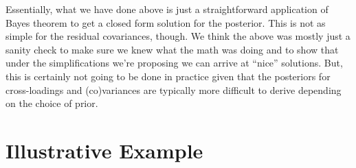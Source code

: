 \documentclass[man, noextraspace, floatsintext, 12pt]{apa7}
\begin{document}
Essentially, what we have done above is just a straightforward application of Bayes theorem to get a closed form solution for the posterior.
This is not as simple for the residual covariances, though.
We think the above was mostly just a sanity check to make sure we knew what the math was doing and to show that under the simplifications we're proposing we can arrive at ``nice'' solutions.
But, this is certainly not going to be done in practice given that the posteriors for cross-loadings and (co)variances are typically more difficult to derive depending on the choice of prior.


%
%
%



\section{Illustrative Example}
\end{document}
